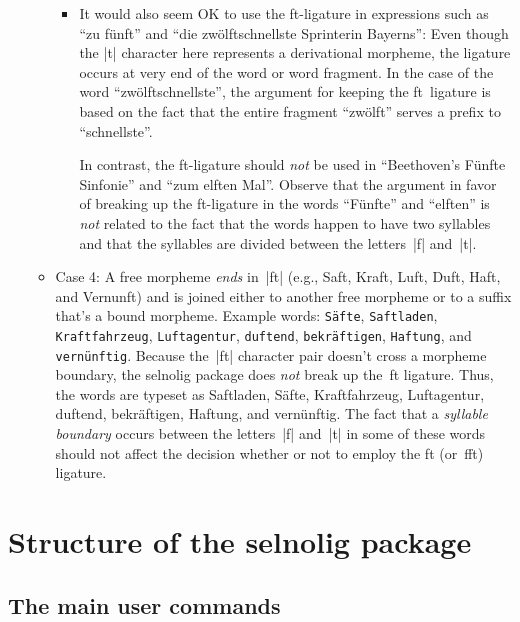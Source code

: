\documentclass[11pt]{article}
\newcommand{\pkg}[1]{\textsf{#1}}
\newcommand{\opt}[1]{\texttt{#1}}
\begin{document}
\begin{itemize}
\begin{itemize}
\begin{itemize}
\item It would also seem OK to use the ft-ligature in expressions such as \enquote{zu fünft} and \enquote{die zwölftschnellste Sprinterin Bayerns}: Even though the |t| character here represents a derivational morpheme, the ligature occurs at very end of the word or word fragment. In the case of the word \enquote{zwölftschnellste}, the argument for keeping the ft~ligature is based on the fact that the entire fragment \enquote{zwölft} serves a prefix to \enquote{schnellste}. 

In contrast, the ft-ligature should \emph{not} be used in \enquote{Beethoven's Fünfte Sinfonie} and \enquote{zum elften Mal}. Observe that the argument in favor of breaking up the ft-ligature in the words \enquote{Fünfte} and \enquote{elften} is \emph{not} related to the fact that the words happen to have two syllables and that the syllables are divided between the letters~|f| and~|t|.

\end{itemize}

\item Case 4: A free morpheme \emph{ends} in~|ft| (e.g., Saft, Kraft, Luft, Duft, Haft, and Vernunft) and is joined either to another free morpheme or to a suffix that's a bound morpheme. Example words: \opt{Säfte}, \opt{Saftladen}, \opt{Kraftfahrzeug}, \opt{Luftagentur}, \opt{duftend}, \opt{bekräftigen}, \opt{Haftung}, and \opt{vernünftig}. Because the~|ft| character pair doesn't cross a morpheme boundary, the \pkg{selnolig} package does \emph{not} break up the~ft ligature. Thus, the words are typeset as Saftladen, Säfte, Kraftfahrzeug, Luftagentur, duftend, bekräftigen, Haftung, and vernünftig. The fact that a \emph{syllable boundary} occurs between the letters~|f| and~|t| in some of these words should not affect the decision whether or not to employ the ft (or~fft) ligature.
\end{itemize}
\end{itemize}



\section[Structure of the selnolig package]{Structure of the \pkg{selnolig} package} \label{sec:structure}

\subsection{The main user commands} \label{sec:syntax}
\end{document}
